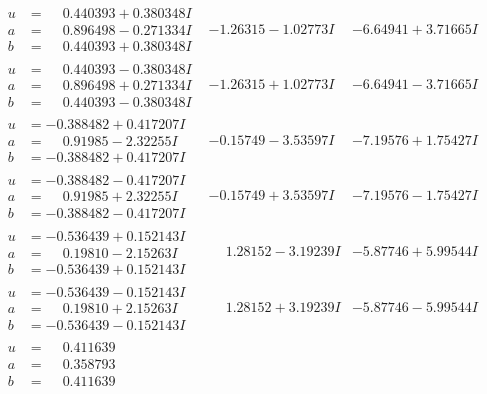 \documentclass[1p]{elsarticle_modified}
\theoremstyle{definition}
\begin{document}
$$\begin{array}{c|c|c}
\begin{aligned}
u &= \phantom{-}0.440393 + 0.380348 I \\
a &= \phantom{-}0.896498 - 0.271334 I \\
b &= \phantom{-}0.440393 + 0.380348 I\end{aligned}
 & -1.26315 - 1.02773 I & -6.64941 + 3.71665 I \\ \hline\begin{aligned}
u &= \phantom{-}0.440393 - 0.380348 I \\
a &= \phantom{-}0.896498 + 0.271334 I \\
b &= \phantom{-}0.440393 - 0.380348 I\end{aligned}
 & -1.26315 + 1.02773 I & -6.64941 - 3.71665 I \\ \hline\begin{aligned}
u &= -0.388482 + 0.417207 I \\
a &= \phantom{-}0.91985 - 2.32255 I \\
b &= -0.388482 + 0.417207 I\end{aligned}
 & -0.15749 - 3.53597 I & -7.19576 + 1.75427 I \\ \hline\begin{aligned}
u &= -0.388482 - 0.417207 I \\
a &= \phantom{-}0.91985 + 2.32255 I \\
b &= -0.388482 - 0.417207 I\end{aligned}
 & -0.15749 + 3.53597 I & -7.19576 - 1.75427 I \\ \hline\begin{aligned}
u &= -0.536439 + 0.152143 I \\
a &= \phantom{-}0.19810 - 2.15263 I \\
b &= -0.536439 + 0.152143 I\end{aligned}
 & \phantom{-}1.28152 - 3.19239 I & -5.87746 + 5.99544 I \\ \hline\begin{aligned}
u &= -0.536439 - 0.152143 I \\
a &= \phantom{-}0.19810 + 2.15263 I \\
b &= -0.536439 - 0.152143 I\end{aligned}
 & \phantom{-}1.28152 + 3.19239 I & -5.87746 - 5.99544 I \\ \hline\begin{aligned}
u &= \phantom{-}0.411639\phantom{ +0.000000I} \\
a &= \phantom{-}0.358793\phantom{ +0.000000I} \\
b &= \phantom{-}0.411639\phantom{ +0.000000I}\end{aligned}

\end{array}$$
\end{document}

